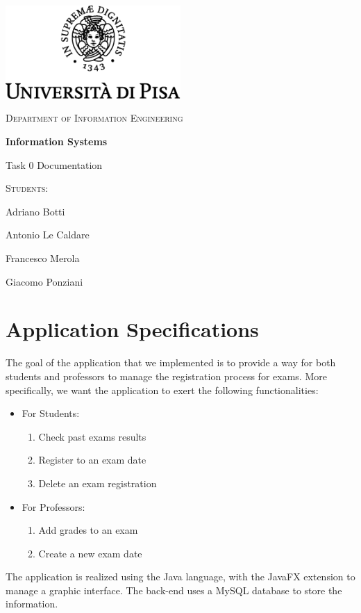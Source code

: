 \documentclass{report}
\begin{document}
	\begin{titlepage}
		\centering
		\includegraphics[width=0.5\textwidth]{unipi.png}\par\vspace{1cm}
		{\scshape\LARGE Department of Information Engineering \par}
		\vspace{1cm}
		{\huge\bfseries Information Systems \par Task 0 Documentation  \par}
		\vspace{2cm}
		\vfill
		{\Large\scshape Students: \par 
			Adriano Botti \par
			Antonio Le Caldare \par
			Francesco Merola \par 
			Giacomo Ponziani \par}
		\vfill
		
	\end{titlepage}
\tableofcontents
\newpage
\listoffigures

\chapter*{Application Specifications}
The goal of the application that we implemented is to provide a way for both students and professors to manage the registration process for exams. More specifically, we want the application to exert the following functionalities:
\begin{itemize}
	\item For Students:
	\begin{enumerate}
		\item Check past exams results
		\item Register to an exam date
		\item Delete an exam registration
	\end{enumerate}
	\item For Professors:
	\begin{enumerate}
		\item Add grades to an exam
		\item Create a new exam date
	\end{enumerate} 
\end{itemize}
The application is realized using the Java language, with the JavaFX extension to manage a graphic interface. The back-end uses a MySQL database to store the information.
\end{document}
